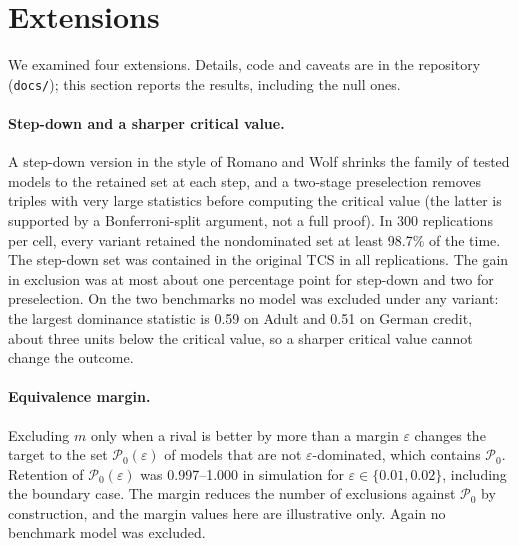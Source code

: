 \documentclass[11pt,a4paper]{article}
\begin{document}
\begin{table}[h]\centering\small
\caption{Number of models retained, for each subset of criteria: TCS and the Pareto front of the point estimates (EO: equalised-odds gap; noise: noise drop).}\label{tab:sub}

\end{table}

\section{Extensions}\label{sec:ext}
We examined four extensions. Details, code and caveats are in the repository (\texttt{docs/}); this section reports the results, including the null ones.

\paragraph{Step-down and a sharper critical value.} A step-down version in the style of Romano and Wolf \citeyearpar{romano2005} shrinks the family of tested models to the retained set at each step, and a two-stage preselection removes triples with very large statistics before computing the critical value (the latter is supported by a Bonferroni-split argument, not a full proof). In 300 replications per cell, every variant retained the nondominated set at least 98.7\% of the time. The step-down set was contained in the original TCS in all replications. The gain in exclusion was at most about one percentage point for step-down and two for preselection. On the two benchmarks no model was excluded under any variant: the largest dominance statistic is 0.59 on Adult and 0.51 on German credit, about three units below the critical value, so a sharper critical value cannot change the outcome.

\paragraph{Equivalence margin.} Excluding $m$ only when a rival is better by more than a margin $\varepsilon$ changes the target to the set $\mathcal{P}_0(\varepsilon)$ of models that are not $\varepsilon$-dominated, which contains $\mathcal{P}_0$. Retention of $\mathcal{P}_0(\varepsilon)$ was 0.997--1.000 in simulation for $\varepsilon\in\{0.01,0.02\}$, including the boundary case. The margin reduces the number of exclusions against $\mathcal{P}_0$ by construction, and the margin values here are illustrative only. Again no benchmark model was excluded.
\end{document}
